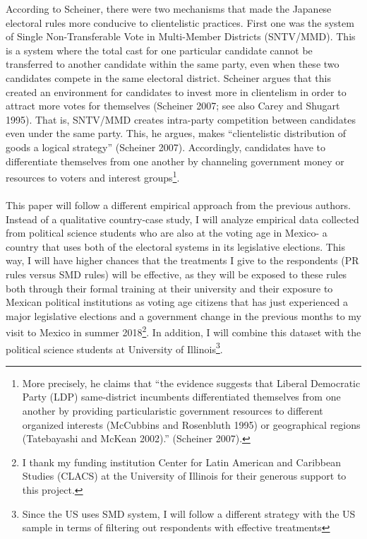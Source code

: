 \documentclass{article}
\begin{document}
According to Scheiner, there were two mechanisms that made the Japanese electoral rules more conducive to clientelistic practices. First one was the system of Single Non-Transferable Vote in Multi-Member Districts (SNTV/MMD). This is a system where the total cast for one particular candidate cannot be transferred to another candidate within the same party, even when these two candidates compete in the same electoral district. Scheiner argues that this created an environment for candidates to invest more in clientelism in order to attract more votes for themselves (Scheiner 2007; see also Carey and Shugart 1995). That is, SNTV/MMD creates intra-party competition between candidates even under the same party. This, he argues, makes ``clientelistic distribution of goods a logical strategy'' (Scheiner 2007). Accordingly, candidates have to differentiate themselves from one another by channeling government money or resources to voters and interest groups\footnote{More precisely, he claims that ``the evidence suggests that Liberal Democratic Party (LDP) same-district incumbents differentiated themselves from one another by providing particularistic government resources to different organized interests (McCubbins and Rosenbluth 1995) or geographical regions (Tatebayashi and McKean 2002).'' (Scheiner 2007).}.\\
\\
This paper will follow a different empirical approach from the previous authors. Instead of a qualitative country-case study, I will analyze empirical data collected from political science students who are also at the voting age in Mexico- a country that uses both of the electoral systems in its legislative elections. This way, I will have higher chances that the treatments I give to the respondents (PR rules versus SMD rules) will be effective, as they will be exposed to these rules both through their formal training at their university and their exposure to Mexican political institutions as voting age citizens that has just experienced a major legislative elections and a government change in the previous months to my visit to Mexico in summer 2018\footnote{I thank my funding institution Center for Latin American and Caribbean Studies (CLACS) at the University of Illinois for their generous support to this project.}. In addition, I will combine this dataset with the political science students at University of Illinois\footnote{Since the US uses SMD system, I will follow a different strategy with the US sample in terms of filtering out respondents with effective treatments}. 
\end{document}
